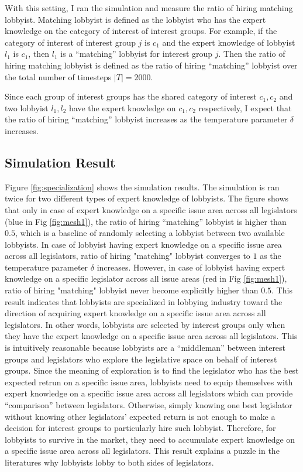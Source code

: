 \documentclass{article}
\begin{document}
With this setting, I ran the simulation and measure 
the ratio of hiring matching lobbyist. 
Matching lobbyist is defined as the lobbyist who has the expert knowledge on the category of interest of interest groups.
For example, if the category of interest of interest group $j$ is $c_1$
and the expert knowledge of lobbyist $l_1$ is $c_1$, 
then $l_1$ is a ``matching'' lobbyist for interest group $j$.
Then the ratio of hiring matching lobbyist is defined as 
the ratio of hiring ``matching'' lobbyist over the total number of timesteps $|T|=2000$.

Since each group of interest groups has the shared category of interest $c_1, c_2$
and two lobbyist $l_1, l_2$ have the expert knowledge on $c_1, c_2$ respectively, 
I expect that the ratio of hiring ``matching'' lobbyist increases 
as the temperature parameter $\delta$ increases. 

\subsection{\large{Simulation Result}}

Figure \ref{fig:specialization} shows the simulation results.
The simulation is ran twice for two different types of expert knowledge of lobbyists.
The figure shows that only in case of expert knowledge on a specific issue area across all legislators (blue in Fig \ref{fig:mesh1}),
the ratio of hiring ``matching'' lobbyist is higher than $0.5$, which is a baseline of randomly selecting a lobbyist between two available lobbyists.
In case of lobbyist having expert knowledge on a specific issue area across all legislators,
ratio of hiring "matching" lobbyist converges to $1$ as the temperature parameter $\delta$ increases. 
However, in case of lobbyist having expert knowledge on a specific legislator across all issue areas (red in Fig \ref{fig:mesh1}),
ratio of hiring "matching" lobbyist never become explicitly higher than $0.5$.
This result indicates that lobbyists are specialized in lobbying industry
toward the direction of acquiring expert knowledge on a specific issue area across all legislators.
In other words, lobbyists are selected by 
interest groups only when they have the expert knowledge on a specific issue area across all legislators.
This is intuitively reasonable because lobbyists are 
a ``middleman'' between interest groups and legislators
who explore the legislative space on behalf of interest groups.
Since the meaning of exploration is to find the legislator 
who has the best expected retrun on a specific issue area,
lobbyists need to equip themselves with expert knowledge on a specific issue area across all legislators
which can provide ``comparison'' between legislators.
Otherwise, simply knowing one best legislator without knowing other legislators' expected return
is not enough to make a decision for interest groups to particularly hire such lobbyist.
Therefore, for lobbyists to survive in the market,
they need to accumulate expert knowledge on a specific issue area across all legislators.
This result explains a puzzle in the literatures why lobbyists lobby to both sides of legislators.
\end{document}
